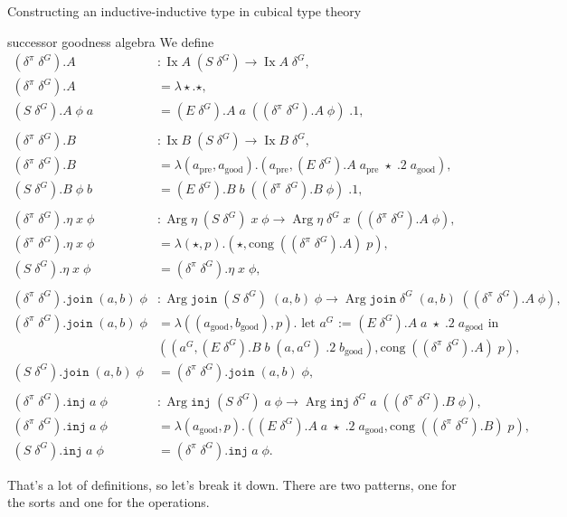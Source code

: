 \documentclass[acmsmall,review]{acmart}\settopmatter{printfolios=true,printccs=false,printacmref=false}
\DeclareMathOperator{\Arg}{Arg}
\DeclareMathOperator{\Ix}{Ix}
\newcommand{\pre}[1]{{#1}_\text{pre}}
\newcommand{\good}[1]{{#1}_\text{good}}
\newcommand{\join}{\texttt{join}}
\newcommand{\inj}{\texttt{inj}}
\begin{document}
\begin{section}{Constructing an inductive-inductive type in cubical type theory}
\begin{subsection}{successor goodness algebra}
We define
\begin{align*}
(\delta^\pi\;\delta^G).A &: \Ix A\;(S\;\delta^G) \to \Ix A\;\delta^G,\\
(\delta^\pi\;\delta^G).A &= \lambda \star. \star,\\
(S\;\delta^G).A\;\phi\;a &= (E\;\delta^G).A\;a\;((\delta^\pi\;\delta^G).A\;\phi)\;.1,\\
\\
(\delta^\pi\;\delta^G).B &: \Ix B\;(S\;\delta^G) \to \Ix B\;\delta^G,\\
(\delta^\pi\;\delta^G).B &= \lambda (\pre{a}, \good{a}). (\pre{a}, (E\;\delta^G).A\;\pre{a}\;\star\;.2\;\good{a}),\\
(S\;\delta^G).B\;\phi\;b &= (E\;\delta^G).B\;b\;((\delta^\pi\;\delta^G).B\;\phi)\;.1,\\
\\
(\delta^\pi\;\delta^G).\eta\;x\;\phi &: \Arg\eta\;(S\;\delta^G)\;x\;\phi \to \Arg\eta\;\delta^G\;x\;((\delta^\pi\;\delta^G).A\;\phi),\\
(\delta^\pi\;\delta^G).\eta\;x\;\phi &= \lambda(\star, p).(\star, \text{cong}\;((\delta^\pi\;\delta^G).A)\;p),\\
(S\;\delta^G).\eta\;x\;\phi &= (\delta^\pi\;\delta^G).\eta\;x\;\phi,\\
\\
(\delta^\pi\;\delta^G).\join\;(a, b)\;\phi &: \Arg\join\;(S\;\delta^G)\; (a, b)\;\phi \to \Arg\join\;\delta^G\;(a, b)\;((\delta^\pi\;\delta^G).A\;\phi),\\
(\delta^\pi\;\delta^G).\join\;(a, b)\;\phi &= \lambda((\good{a}, \good{b}), p).\text{ let $a^G$ := $(E\;\delta^G).A\;a\;\star\;.2\;\good{a}$ in}\\& ((a^G, (E\;\delta^G).B\;b\;(a, a^G)\;.2\;\good{b}), \text{cong}\;((\delta^\pi\;\delta^G).A)\;p),\\
(S\;\delta^G).\join\;(a, b)\;\phi &= (\delta^\pi\;\delta^G).\join\;(a, b)\;\phi,\\
\\
(\delta^\pi\;\delta^G).\inj\;a\;\phi &: \Arg\inj\;(S\;\delta^G)\;a\;\phi \to \Arg\inj\;\delta^G\;a\;((\delta^\pi\;\delta^G).B\;\phi),\\
(\delta^\pi\;\delta^G).\inj\;a\;\phi &= \lambda(\good{a}, p). ((E\;\delta^G).A\;a\;\star\;.2\;\good{a}, \text{cong}\;((\delta^\pi\;\delta^G).B)\;p),\\
(S\;\delta^G).\inj\;a\;\phi &= (\delta^\pi\;\delta^G).\inj\;a\;\phi.
\end{align*}

That's a lot of definitions, so let's break it down. There are two patterns, one for the sorts and one for the operations.


\end{subsection}
\end{section}
\end{document}
